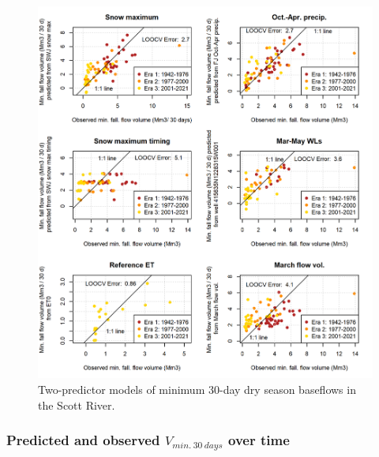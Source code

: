 \documentclass[
]{article}
\begin{document}
\begin{figure}
\includegraphics[width=1\linewidth]{f11} \caption{\label{fig:two_predictor_model} Two-predictor models of minimum 30-day dry season baseflows in the Scott River.}\label{fig:two_predictor_model}
\end{figure}

\hypertarget{predicted-and-observed-v_min.30days-over-time}{%
\subsubsection{\texorpdfstring{Predicted and observed
\(V_{min.~30~days}\) over
time}{Predicted and observed V\_\{min.\textasciitilde30\textasciitilde days\} over time}}\label{predicted-and-observed-v_min.30days-over-time}}
\end{document}
